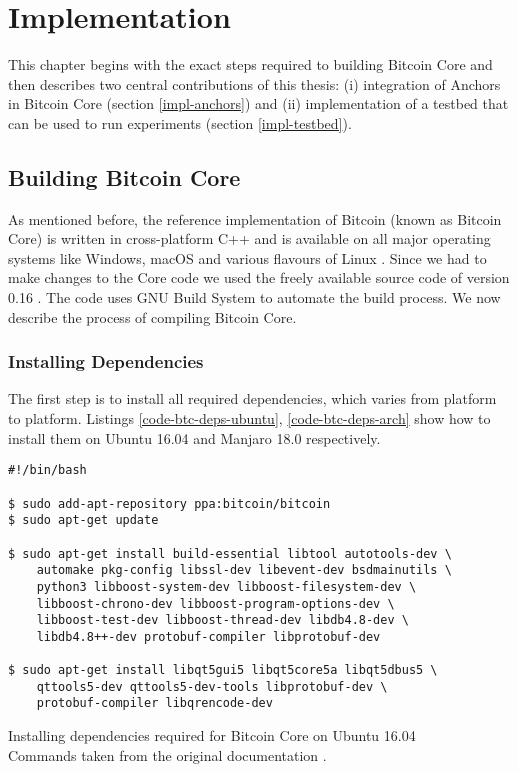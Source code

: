 
\chapter{Implementation} \label{ch-impl}

This chapter begins with the exact steps required to building Bitcoin Core
and then describes two central contributions of this thesis: 
(i) integration of Anchors in Bitcoin Core (section \ref{impl-anchors}) and 
(ii) implementation of a testbed that can be used to run experiments (section \ref{impl-testbed}).

\section{Building Bitcoin Core} \label{impl-btc-compile}

As mentioned before, the reference implementation of Bitcoin (known as Bitcoin Core) is written in cross-platform C++ and is available on all major operating systems like Windows, macOS and various flavours of Linux \cite{bitcoinDownload}. Since we had to make changes to the Core code we used the freely available source code of version 0.16 \cite{bitcoinSource}. The code uses GNU Build System \cite{gnuBuild} to automate the build process. We now describe the process of compiling Bitcoin Core. 

\subsection*{Installing Dependencies}

The first step is to install all required dependencies, which varies from platform to platform. Listings \ref{code-btc-deps-ubuntu}, \ref{code-btc-deps-arch} show how to install them on Ubuntu 16.04 and Manjaro 18.0 respectively.

\begin{listing}[!htb]
    \begin{verbatim}
#!/bin/bash

$ sudo add-apt-repository ppa:bitcoin/bitcoin
$ sudo apt-get update

$ sudo apt-get install build-essential libtool autotools-dev \
    automake pkg-config libssl-dev libevent-dev bsdmainutils \
    python3 libboost-system-dev libboost-filesystem-dev \
    libboost-chrono-dev libboost-program-options-dev \
    libboost-test-dev libboost-thread-dev libdb4.8-dev \
    libdb4.8++-dev protobuf-compiler libprotobuf-dev

$ sudo apt-get install libqt5gui5 libqt5core5a libqt5dbus5 \
    qttools5-dev qttools5-dev-tools libprotobuf-dev \
    protobuf-compiler libqrencode-dev

    \end{verbatim}

    \caption[Installing dependencies required for Bitcoin Core on Ubuntu 16.04]
    {
    Installing dependencies required for Bitcoin Core on Ubuntu 16.04 \\
    \footnotesize
    Commands taken from the original documentation \cite{bitcoinBuildUnix}.
    }
    \label{code-btc-deps-ubuntu}
\end{listing}



